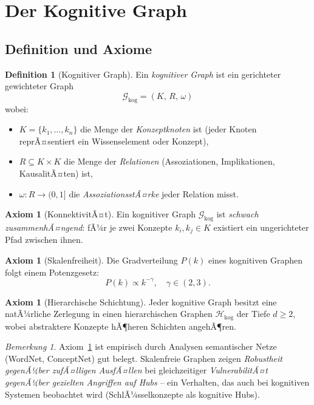 ﻿\documentclass[12pt,a4paper]{article}
\theoremstyle{plain}
\theoremstyle{definition}
\newtheorem{definition}[theorem]{Definition}
\newtheorem{axiom}[theorem]{Axiom}
\theoremstyle{remark}
\newtheorem{bemerkung}[theorem]{Bemerkung}
\newcommand{\GG}{\mathcal{G}}
\newcommand{\HH}{\mathcal{H}}
\begin{document}
\section{Der Kognitive Graph}
\label{sec:kognitivergraph}

\subsection{Definition und Axiome}

\begin{definition}[Kognitiver Graph]
\label{def:kognitiv}
Ein \emph{kognitiver Graph} ist ein gerichteter gewichteter Graph
\[
  \GG_{\text{kog}} = (K,\, R,\, \omega)
\]
wobei:
\begin{itemize}
  \item $K = \{k_1, \ldots, k_n\}$ die Menge der \emph{Konzeptknoten} ist (jeder Knoten reprÃ¤sentiert ein Wissenselement oder Konzept),
  \item $R \subseteq K \times K$ die Menge der \emph{Relationen} (Assoziationen, Implikationen, KausalitÃ¤ten) ist,
  \item $\omega: R \to (0,1]$ die \emph{AssoziationsstÃ¤rke} jeder Relation misst.
\end{itemize}
\end{definition}

\begin{axiom}[KonnektivitÃ¤t]
\label{ax:konnektivitaet}
Ein kognitiver Graph $\GG_{\text{kog}}$ ist \emph{schwach zusammenhÃ¤ngend}: fÃ¼r je zwei Konzepte $k_i, k_j \in K$ existiert ein ungerichteter Pfad zwischen ihnen.
\end{axiom}

\begin{axiom}[Skalenfreiheit]
\label{ax:skalenfrei}
Die Gradverteilung $P(k)$ eines kognitiven Graphen folgt einem Potenzgesetz:
\[
  P(k) \propto k^{-\gamma}, \quad \gamma \in (2, 3).
\]
\end{axiom}

\begin{axiom}[Hierarchische Schichtung]
\label{ax:hierarchie}
Jeder kognitive Graph besitzt eine natÃ¼rliche Zerlegung in einen hierarchischen Graphen $\HH_{\text{kog}}$ der Tiefe $d \geq 2$, wobei abstraktere Konzepte hÃ¶heren Schichten angehÃ¶ren.
\end{axiom}

\begin{bemerkung}
Axiom~\ref{ax:skalenfrei} ist empirisch durch Analysen semantischer Netze (WordNet, ConceptNet) gut belegt. Skalenfreie Graphen zeigen \emph{Robustheit gegenÃ¼ber zufÃ¤lligen AusfÃ¤llen} bei gleichzeitiger \emph{VulnerabilitÃ¤t gegenÃ¼ber gezielten Angriffen auf Hubs} -- ein Verhalten, das auch bei kognitiven Systemen beobachtet wird (SchlÃ¼sselkonzepte als kognitive Hubs).
\end{bemerkung}
\end{document}
